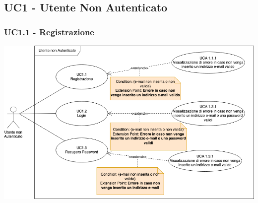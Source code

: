 \subsection{UC1 - Utente Non Autenticato}

\subsubsection{UC1.1 - Registrazione}
\begin{center}
\includegraphics[scale=0.5]{UC_images/UC1.png}
\end{center}
